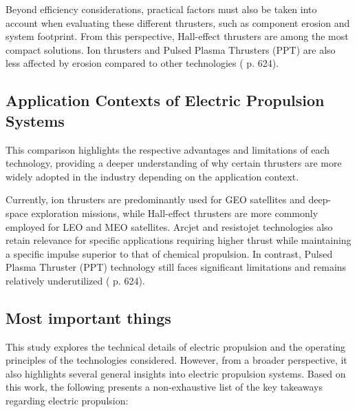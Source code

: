 Beyond efficiency considerations, practical factors must also be taken into account when evaluating these different thrusters, such as component erosion and system footprint. From this perspective, Hall-effect thrusters are among the most compact solutions. Ion thrusters and Pulsed Plasma Thrusters (PPT) are also less affected by erosion compared to other technologies (\cite{rpe_book} p. 624).

\subsection{Application Contexts of Electric Propulsion Systems}
This comparison highlights the respective advantages and limitations of each technology, providing a deeper understanding of why certain thrusters are more widely adopted in the industry depending on the application context.

Currently, ion thrusters are predominantly used for GEO satellites and deep-space exploration missions, while Hall-effect thrusters are more commonly employed for LEO and MEO satellites. Arcjet and resistojet technologies also retain relevance for specific applications requiring higher thrust while maintaining a specific impulse superior to that of chemical propulsion. In contrast, Pulsed Plasma Thruster (PPT) technology still faces significant limitations and remains relatively underutilized (\cite{rpe_book} p. 624).

\subsection{Most important things}

This study explores the technical details of electric propulsion and the operating principles of the technologies considered. However, from a broader perspective, it also highlights several general insights into electric propulsion systems. Based on this work, the following presents a non-exhaustive list of the key takeaways regarding electric propulsion:

